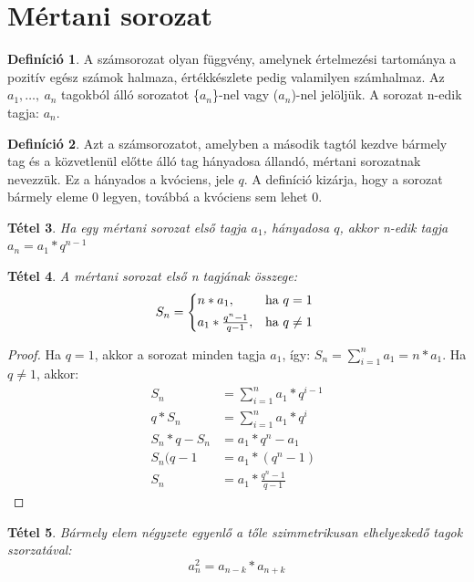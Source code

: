 \documentclass[twoside,12pt]{report}
\newtheorem{theorem}{Tétel}[section]
\theoremstyle{definition}
\newtheorem{definition}[theorem]{Definíció}
\begin{document}
\section{Mértani sorozat}
	\begin{definition}
		A számsorozat olyan függvény, amelynek értelmezési tartománya a pozitív egész számok
		halmaza, értékkészlete pedig valamilyen számhalmaz. Az $a_1,\dots,\ a_n$ tagokból álló sorozatot \{$a_n$\}-nel vagy ($a_n$)-nel jelöljük. A sorozat n-edik tagja: $a_n$.
	\end{definition}
	\begin{definition}
		Azt a számsorozatot, amelyben a második tagtól kezdve bármely tag és a közvetlenül
		előtte álló tag hányadosa állandó, mértani sorozatnak nevezzük. Ez a hányados a kvóciens,
		jele $q$. A definíció kizárja, hogy a sorozat bármely eleme 0 legyen, továbbá a kvóciens sem lehet 0.
	\end{definition}
	\begin{theorem}
		Ha egy mértani sorozat első tagja $a_1$, hányadosa $q$, akkor n-edik tagja $a_n=a_1*q^{n-1}$
	\end{theorem}
	\begin{theorem}
		A mértani sorozat első n tagjának összege:
			\begin{equation*}
			S_n=
			\begin{cases*}
			n*a_1,& ha $q=1$\\
			a_1*\frac{q^n-1}{q-1},& ha $q\neq 1$
			\end{cases*}
		\end{equation*}
	\end{theorem}
	\begin{proof}
		Ha $q=1$, akkor a sorozat minden tagja $a_1$, így: $S_n=\sum_{i=1}^{n} a_1=n*a_1$. Ha $q\ne1$, akkor:
		\begin{align*}
			S_n&=\sum_{i=1}^n a_1*q^{i-1}\\
			q*S_n&=\sum_{i=1}^n a_1*q^i\\
			S_n*q-S_n&=a_1*q^n-a_1\tag{Két egyenletet kivonva egymásból}\\
			S_n(q-1&=a_1*(q^n-1)\\
			S_n&=a_1*\frac{q^n-1}{q-1}\tag{Mindkét oldal osztva $q-1\ne0$-val}
		\end{align*}
	\end{proof}
	\begin{theorem}
		Bármely elem négyzete egyenlő a tőle szimmetrikusan elhelyezkedő tagok szorzatával:
		\begin{equation*}
			a_n^2=a_{n-k}*a_{n+k}
		\end{equation*}
	\end{theorem}
\end{document}
